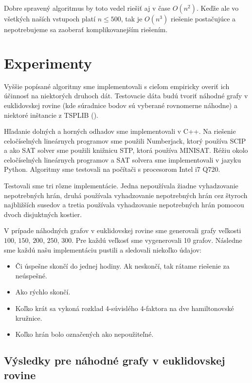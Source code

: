 \begin{poznamka}
Dobre spravený algoritmus by toto vedel riešiť aj v čase $O(n^2)$. Keďže ale vo všetkých
naších vstupoch platí $n \leq 500$, tak je $O(n^3)$ riešenie postačujúce a nepotrebujeme sa zaoberať
komplikovanejším riešením.
\end{poznamka}

\section{Experimenty}

Vyššie popísané algoritmy sme implementovali s cieľom empiricky overiť ich účinnosť na
niektorých druhoch dát. Testovacie dáta budú tvoriť náhodné grafy v euklidovskej rovine (kde
súradnice bodov sú vyberané rovnomerne náhodne) a niektoré inštancie z TSPLIB (\cite{tsplib}).

Hľadanie dolných a horných odhadov sme implementovali v C++. Na riešenie celočíselných
lineárnych programov sme použili Numberjack, ktorý používa SCIP a ako SAT solver sme použili knižnicu STP, ktorá
používa MINISAT. Réžiu okolo celočíselných lineárnych programov a SAT solvera sme
implementovali v jazyku Python. Algoritmy sme testovali na počítači s procesorom
Intel i7 Q720. 

Testovali sme tri rôzne implementácie. Jedna nepoužívala žiadne vyhadzovanie nepotrebných
hrán, druhá používala vyhadzovanie nepotrebných hrán cez štyroch najbližších susedov a tretia
používala vyhadzovanie nepotrebných hrán pomocou dvoch disjuktných kostier.

V prípade náhodných grafov v euklidovskej rovine sme generovali grafy veľkosti $100$, $150$, $200$,
$250$, $300$. Pre každú veľkosť sme vygenerovali 10 grafov.
Následne sme každú našu implementáciu pustili a sledovali niekoľko údajov:
\begin{itemize}
\item Či úspešne skončí do jednej hodiny. Ak neskončí, tak rátame riešenie za neúspešné.
\item Ako rýchlo skončí.
\item Koľko krát sa vykoná rozklad 4-súvislého 4-faktora na dve hamiltonovské kružnice.
\item Koľko hrán bolo označených ako nepoužiteľné.
\end{itemize}

\subsection{Výsledky pre náhodné grafy v euklidovskej rovine}

